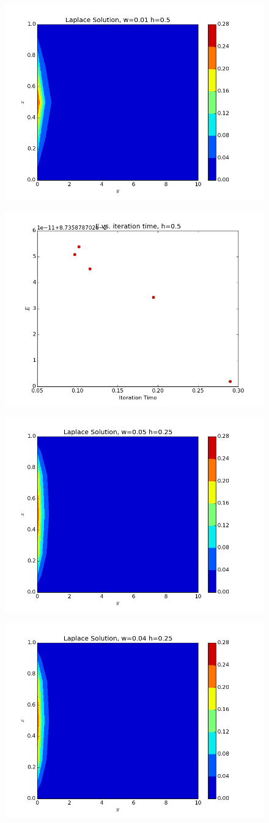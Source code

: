 \documentclass[10pt,letter]{article}
\begin{document}
\begin{figure}[H]
  \centering
    \includegraphics[width=.6\textwidth]{homework7_problem1_plot5}
\end{figure}
\begin{figure}[H]
  \centering
    \includegraphics[width=.6\textwidth]{homework7_problem1_plot6}
\end{figure}
\begin{figure}[H]
  \centering
    \includegraphics[width=.6\textwidth]{homework7_problem1_plot7}
\end{figure}
\begin{figure}[H]
  \centering
    \includegraphics[width=.6\textwidth]{homework7_problem1_plot8}
\end{figure}
\end{document}
